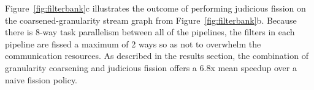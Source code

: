 Figure~\ref{fig:filterbank}c illustrates the outcome of performing
judicious fission on the coarsened-granularity stream graph from
Figure~\ref{fig:filterbank}b.  Because there is 8-way task
parallelism between all of the pipelines, the filters in each pipeline
are fissed a maximum of 2 ways so as not to overwhelm the
communication resources.  As described in the results section, the
combination of granularity coarsening and judicious fission offers
a 6.8x mean speedup over a naive fission policy.
